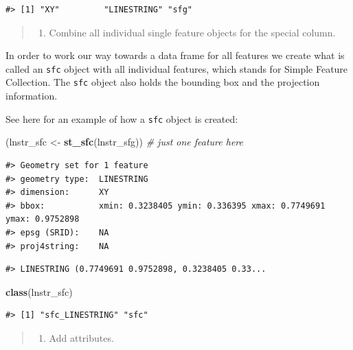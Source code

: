 \documentclass[]{book}
\newenvironment{Shaded}{\begin{snugshade}}{\end{snugshade}}
\newcommand{\KeywordTok}[1]{\textcolor[rgb]{0.13,0.29,0.53}{\textbf{#1}}}
\newcommand{\StringTok}[1]{\textcolor[rgb]{0.31,0.60,0.02}{#1}}
\newcommand{\CommentTok}[1]{\textcolor[rgb]{0.56,0.35,0.01}{\textit{#1}}}
\newcommand{\NormalTok}[1]{#1}
\providecommand{\tightlist}{%
  \setlength{\itemsep}{0pt}\setlength{\parskip}{0pt}}
\theoremstyle{definition}
\theoremstyle{definition}
\theoremstyle{definition}
\theoremstyle{remark}
\begin{document}
\begin{verbatim}
#> [1] "XY"         "LINESTRING" "sfg"
\end{verbatim}

\begin{quote}
\begin{enumerate}
\def\labelenumi{\Roman{enumi}.}
\setcounter{enumi}{1}
\tightlist
\item
  Combine all individual single feature objects for the special column.
\end{enumerate}
\end{quote}

In order to work our way towards a data frame for all features we create
what is called an \texttt{sfc} object with all individual features,
which stands for Simple Feature Collection. The \texttt{sfc} object also
holds the bounding box and the projection information.

See here for an example of how a \texttt{sfc} object is created:

\begin{Shaded}
\begin{Highlighting}[]
\NormalTok{(lnstr_sfc <-}\StringTok{ }\KeywordTok{st_sfc}\NormalTok{(lnstr_sfg)) }\CommentTok{# just one feature here}
\end{Highlighting}
\end{Shaded}

\begin{verbatim}
#> Geometry set for 1 feature 
#> geometry type:  LINESTRING
#> dimension:      XY
#> bbox:           xmin: 0.3238405 ymin: 0.336395 xmax: 0.7749691 ymax: 0.9752898
#> epsg (SRID):    NA
#> proj4string:    NA
\end{verbatim}

\begin{verbatim}
#> LINESTRING (0.7749691 0.9752898, 0.3238405 0.33...
\end{verbatim}

\begin{Shaded}
\begin{Highlighting}[]
\KeywordTok{class}\NormalTok{(lnstr_sfc) }
\end{Highlighting}
\end{Shaded}

\begin{verbatim}
#> [1] "sfc_LINESTRING" "sfc"
\end{verbatim}

\begin{quote}
\begin{enumerate}
\def\labelenumi{\Roman{enumi}.}
\setcounter{enumi}{2}
\tightlist
\item
  Add attributes.
\end{enumerate}
\end{quote}
\end{document}
